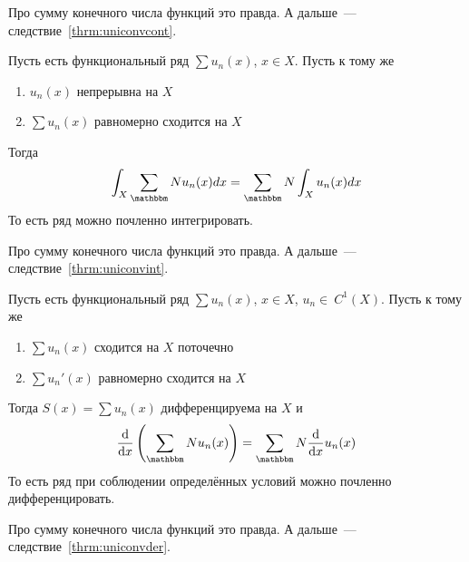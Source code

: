 \documentclass[12pt]{../../notes}
\begin{document}
\begin{ittproof}
  Про сумму конечного числа функций это правда. А дальше~---  следствие~\ref{thrm:uniconvcont}.
\end{ittproof}

\begin{thrm}\label{thrm:uniconvseriesint}
  Пусть есть функциональный ряд $\sum u_n(x)$, $x\in X$. Пусть к тому же
  \begin{enumerate}
    \item $u_n(x)$ непрерывна на $X$
    \item $\sum u_n(x)$ равномерно сходится на $X$
  \end{enumerate}
  Тогда 
  \[
    \int_X \sum_\N u_n(x) dx = \sum_\N \int_X u_n(x) dx 
  \]
  То есть ряд можно почленно интегрировать.
\end{thrm}

\begin{ittproof}
  Про сумму конечного числа функций это правда. А дальше~---  следствие~\ref{thrm:uniconvint}.
\end{ittproof}

\begin{thrm}\label{thrm:uniconvseriesderiv}
  Пусть есть функциональный ряд $\sum u_n(x)$, $x\in X$, $u_n\in~C^1(X)$. Пусть к тому же
  \begin{enumerate}
    \item $\sum u_n(x)$ сходится на $X$ поточечно
    \item $\sum u_n'(x)$ равномерно сходится на $X$
  \end{enumerate}
  Тогда $S(x) = \sum u_n(x)$ дифференцируема на $X$ и
  \[
    \frac{\mathrm{d}}{\mathrm{d}x}\left( \sum_\N u_n(x) \right) = \sum_\N \frac{\mathrm{d}}{\mathrm{d}x} u_n(x)
  \]
  То есть ряд при соблюдении определённых условий можно почленно дифференцировать. 
\end{thrm}

\begin{ittproof}
  Про сумму конечного числа функций это правда. А дальше~---  следствие~\ref{thrm:uniconvder}.
\end{ittproof}
\end{document}

